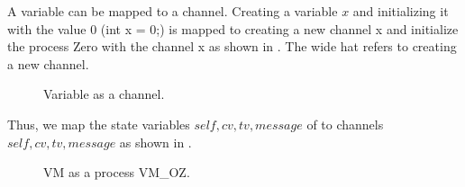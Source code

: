 A variable can be mapped to a channel. Creating a variable $x$ and initializing it with the value $0$ (int x = 0;) is mapped to creating a new channel x and initialize the process Zero with the channel x
as shown in . The wide hat refers to creating a new channel.
\begin{figure}[H]%
\centering
{}%
\hspace{1em}%
%
\caption{Variable as a channel.}
\label{tra_var}%
\end{figure}

Thus, we map the state variables $self, cv, tv, message$ of  to \picalc{} channels $self, cv, tv, message$ as shown in .

\begin{figure}[H]
\centering
{}
\caption{VM as a \picalc{} process VM\_OZ.}
\label{tra_var2}
\end{figure}